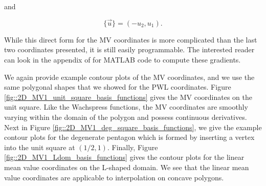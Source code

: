 \noindent and 

\begin{equation}
\label{eq::BF_mv_red_flop}
\{  \vec{u} \} = \left( - u_2 , u_1  \right). 
\end{equation}

\noindent While this direct form for the MV coordinates is more complicated than the last two coordinates presented, it is still easily programmable. The interested reader can look in the appendix of \cite{floater2015generalized} for MATLAB code to compute these gradients.

We again provide example contour plots of the MV coordinates, and we use the same polygonal shapes that we showed for the PWL coordinates. Figure \ref{fig::2D_MV1_unit_square_basis_functions} gives the MV coordinates on the unit square. Like the Wachspress functions, the MV coordinates are smoothly varying within the domain of the polygon and possess continuous derivatives. Next in Figure \ref{fig::2D_MV1_deg_square_basis_functions}, we give the example contour plots for the degenerate pentagon which is formed by inserting a vertex into the unit square at $(1/2,1)$. Finally, Figure \ref{fig::2D_MV1_Ldom_basis_functions} gives the contour plots for the linear mean value coordinates on the L-shaped domain. We see that the linear mean value coordinates are applicable to interpolation on concave polygons.

